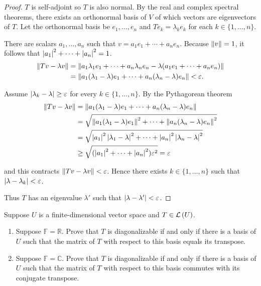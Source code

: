 \begin{proof}
    $T$ is self-adjoint so $T$ is also normal. By the real and complex spectral theorems, there exists an orthonormal basis of $V$ of which vectors are eigenvectors of $T$. Let the orthonormal basis be $e_{1}, \ldots, e_{n}$ and $Te_{k} = \lambda_{k}e_{k}$ for each $k\in\{1,\ldots,n\}$.

    There are scalars $a_{1}, \ldots, a_{n}$ such that $v = a_{1}e_{1} + \cdots + a_{n}e_{n}$. Because $\left\Vert{v}\right\Vert = 1$, it follows that $\left\vert{a_{1}}\right\vert^{2} + \cdots + \left\vert{a_{n}}\right\vert^{2} = 1$.
    \begin{align*}
        \left\Vert{Tv - \lambda v}\right\Vert & = \left\Vert{a_{1}\lambda_{1}e_{1} + \cdots + a_{n}\lambda_{n}e_{n} - \lambda (a_{1}e_{1} + \cdots + a_{n}e_{n})}\right\Vert \\
                              & = \left\Vert{a_{1}(\lambda_{1} - \lambda)e_{1} + \cdots + a_{n}(\lambda_{n} - \lambda)e_{n}}\right\Vert < \varepsilon.
    \end{align*}

    Assume $\left\vert{\lambda_{k} - \lambda}\right\vert\geq\varepsilon$ for every $k\in\{ 1,\ldots,n \}$. By the Pythagorean theorem
    \begin{align*}
        \left\Vert{Tv - \lambda v}\right\Vert & = \left\Vert{a_{1}(\lambda_{1} - \lambda)e_{1} + \cdots + a_{n}(\lambda_{n} - \lambda)e_{n}}\right\Vert                           \\
                              & = \sqrt{\left\Vert{a_{1}(\lambda_{1} - \lambda)e_{1}}\right\Vert^{2} + \cdots + \left\Vert{a_{n}(\lambda_{n} - \lambda)e_{n}}\right\Vert^{2}}     \\
                              & = \sqrt{\left\vert{a_{1}}\right\vert^{2}\left\vert{\lambda_{1} - \lambda}\right\vert^{2} + \cdots + \left\vert{a_{n}}\right\vert^{2}\left\vert{\lambda_{n} - \lambda}\right\vert^{2}} \\
                              & \geq \sqrt{(\left\vert{a_{1}}\right\vert^{2} + \cdots + \left\vert{a_{n}}\right\vert^{2})\varepsilon^{2}} = \varepsilon
    \end{align*}

    and this contracts $\left\Vert{Tv - \lambda v}\right\Vert < \varepsilon$. Hence there exists $k\in\{1,\ldots, n\}$ such that $\left\vert{\lambda - \lambda_{k}}\right\vert < \varepsilon$.

    Thus $T$ has an eigenvalue $\lambda'$ such that $\left\vert{\lambda - \lambda'}\right\vert < \varepsilon$.
\end{proof}
\newpage

\begin{exercise}
    Suppose $U$ is a finite-dimensional vector space and $T\in\mathcal{L}\left({U}\right)$.
    \begin{enumerate}[label={(\alph*)}]
        \item Suppose $\mathbb{F} = \mathbb{R}$. Prove that $T$ is diagonalizable if and only if there is a basis of $U$ such that the matrix of $T$ with respect to this basis equals its transpose.
        \item Suppose $\mathbb{F} = \mathbb{C}$. Prove that $T$ is diagonalizable if and only if there is a basis of $U$ such that the matrix of $T$ with respect to this basis commutes with its conjugate transpose.
    \end{enumerate}
\end{exercise}

